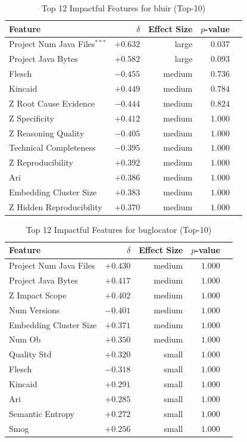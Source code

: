 \begin{table}[h]
\centering
\caption{Top 12 Impactful Features for bluir (Top-10)}
\label{tab:tool_features_bluir_top10}
\begin{tabular}{lrrrr}
\toprule
Feature & $\delta$ & Effect Size & $p$-value \\
\midrule
Project Num Java Files$^{***}$ & $+0.632$ & large & $0.037$ \\
Project Java Bytes & $+0.582$ & large & $0.093$ \\
Flesch & $-0.455$ & medium & $0.736$ \\
Kincaid & $+0.449$ & medium & $0.784$ \\
Z Root Cause Evidence & $-0.444$ & medium & $0.824$ \\
Z Specificity & $+0.412$ & medium & $1.000$ \\
Z Reasoning Quality & $-0.405$ & medium & $1.000$ \\
Technical Completeness & $-0.395$ & medium & $1.000$ \\
Z Reproducibility & $+0.392$ & medium & $1.000$ \\
Ari & $+0.386$ & medium & $1.000$ \\
Embedding Cluster Size & $+0.383$ & medium & $1.000$ \\
Z Hidden Reproducibility & $+0.370$ & medium & $1.000$ \\
\bottomrule
\end{tabular}
\end{table}

\begin{table}[h]
\centering
\caption{Top 12 Impactful Features for buglocator (Top-10)}
\label{tab:tool_features_buglocator_top10}
\begin{tabular}{lrrrr}
\toprule
Feature & $\delta$ & Effect Size & $p$-value \\
\midrule
Project Num Java Files & $+0.430$ & medium & $1.000$ \\
Project Java Bytes & $+0.417$ & medium & $1.000$ \\
Z Impact Scope & $+0.402$ & medium & $1.000$ \\
Num Versions & $-0.401$ & medium & $1.000$ \\
Embedding Cluster Size & $+0.371$ & medium & $1.000$ \\
Num Ob & $+0.350$ & medium & $1.000$ \\
Quality Std & $+0.320$ & small & $1.000$ \\
Flesch & $-0.318$ & small & $1.000$ \\
Kincaid & $+0.291$ & small & $1.000$ \\
Ari & $+0.285$ & small & $1.000$ \\
Semantic Entropy & $+0.272$ & small & $1.000$ \\
Smog & $+0.256$ & small & $1.000$ \\
\bottomrule
\end{tabular}
\end{table}

